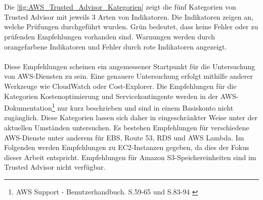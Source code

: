 \\\\
Die \autoref{fig:AWS_Trusted_Advisor_Kategorien} zeigt die fünf Kategorien von Trusted Advisor mit jeweils 3 Arten von Indikatoren. Die Indikatoren zeigen an, welche Prüfungen durchgeführt wurden. Grün bedeutet, dass keine Fehler oder zu prüfenden Empfehlungen vorhanden sind. Warnungen werden durch orangefarbene Indikatoren und Fehler durch rote Indikatoren angezeigt. 
\\\\
Diese Empfehlungen scheinen ein angemessener Startpunkt für die Untersuchung von AWS-Diensten zu sein. Eine genauere Untersuchung erfolgt mithilfe anderer Werkzeuge wie CloudWatch oder Cost-Explorer. %
Die Empfehlungen für die Kategorien Kostenoptimierung und Servicekontingente werden in der AWS-Dokumentation\footnote{AWS Support - Benutzerhandbuch. S.59-65 und S.83-94 \cite{AMZ37}} nur kurz beschrieben und sind in einem Basiskonto nicht zugänglich. Diese Kategorien lassen sich daher in eingeschränkter Weise unter der aktuellen Umständen untersuchen.
%
Es bestehen Empfehlungen für verschiedene AWS-Dienste unter anderem für EBS, Route 53, RDS und AWS Lambda. Im Folgenden werden Empfehlungen zu EC2-Instanzen gegeben, da dies der Fokus dieser Arbeit entspricht. Empfehlungen für Amazon S3-Speichereinheiten sind im Trusted Advisor nicht verfügbar.
